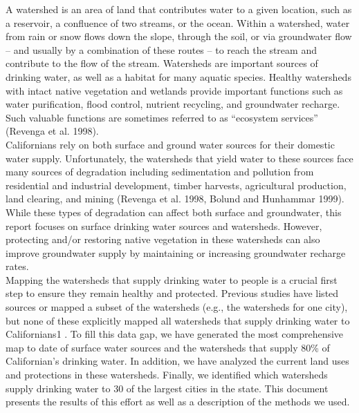 \documentclass{article}
\begin{document}
A watershed is an area of land that contributes water to a given location, such as a reservoir, a
confluence of two streams, or the ocean. Within a watershed, water from rain or snow flows
down the slope, through the soil, or via groundwater flow – and usually by a combination of
these routes – to reach the stream and contribute to the flow of the stream. Watersheds are
important sources of drinking water, as well as a habitat for many aquatic species. Healthy
watersheds with intact native vegetation and wetlands provide important functions such as
water purification, flood control, nutrient recycling, and groundwater recharge. Such valuable
functions are sometimes referred to as “ecosystem services” (Revenga et al. 1998).\\
Californians rely on both surface and ground water sources for their domestic water supply.
Unfortunately, the watersheds that yield water to these sources face many sources of
degradation including sedimentation and pollution from residential and industrial
development, timber harvests, agricultural production, land clearing, and mining (Revenga et al.
1998, Bolund and Hunhammar 1999). While these types of degradation can affect both surface
and groundwater, this report focuses on surface drinking water sources and watersheds.
However, protecting and/or restoring native vegetation in these watersheds can also improve
groundwater supply by maintaining or increasing groundwater recharge rates.\\
Mapping the watersheds that supply drinking water to people is a crucial first step to ensure
they remain healthy and protected. Previous studies have listed sources or mapped a subset of
the watersheds (e.g., the watersheds for one city), but none of these explicitly mapped all
watersheds that supply drinking water to Californians1
. To fill this data gap, we have generated
the most comprehensive map to date of surface water sources and the watersheds that supply
80\% of Californian’s drinking water. In addition, we have analyzed the current land uses and
protections in these watersheds. Finally, we identified which watersheds supply drinking water
to 30 of the largest cities in the state. This document presents the results of this effort as well
as a description of the methods we used.\\
\end{document}
